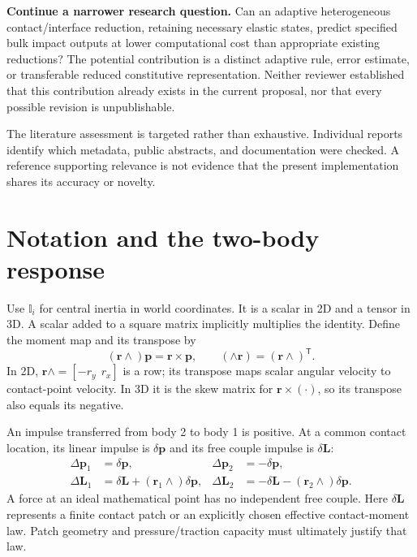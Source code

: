 \documentclass[11pt,a4paper]{article}
\newcommand{\bv}[1]{\bm{#1}}\newcommand{\inertia}{\mathbb I}
\newcommand{\rw}[1]{(\bv r_{#1}\wedge)}\newcommand{\lw}[1]{(\wedge\bv r_{#1})}
\begin{document}
\textbf{Continue a narrower research question.} Can an adaptive heterogeneous contact/interface reduction, retaining necessary elastic states, predict specified bulk impact outputs at lower computational cost than appropriate existing reductions? The potential contribution is a distinct adaptive rule, error estimate, or transferable reduced constitutive representation. Neither reviewer established that this contribution already exists in the current proposal, nor that every possible revision is unpublishable.

The literature assessment is targeted rather than exhaustive. Individual reports identify which metadata, public abstracts, and documentation were checked. A reference supporting relevance is not evidence that the present implementation shares its accuracy or novelty.

\section{Notation and the two-body response}
Use $\inertia_i$ for central inertia in world coordinates. It is a scalar in 2D and a tensor in 3D. A scalar added to a square matrix implicitly multiplies the identity. Define the moment map and its transpose by
\begin{equation}
(\bv r\wedge)\bv p=\bv r\times\bv p,
\qquad (\wedge\bv r)=(\bv r\wedge)^{\mathsf T}.
\end{equation}
In 2D, $\bv r\wedge=[-r_y\ \ r_x]$ is a row; its transpose maps scalar angular velocity to contact-point velocity. In 3D it is the skew matrix for $\bv r\times(\cdot)$, so its transpose also equals its negative.

An impulse transferred from body 2 to body 1 is positive. At a common contact location, its linear impulse is $\delta\bv p$ and its free couple impulse is $\delta\bv L$:
\begin{align}
\Delta\bv p_1&=\delta\bv p,&\Delta\bv p_2&=-\delta\bv p,\\
\Delta\bv L_1&=\delta\bv L+\rw1\delta\bv p,
&\Delta\bv L_2&=-\delta\bv L-\rw2\delta\bv p.
\end{align}
A force at an ideal mathematical point has no independent free couple. Here $\delta\bv L$ represents a finite contact patch or an explicitly chosen effective contact-moment law. Patch geometry and pressure/traction capacity must ultimately justify that law.
\end{document}
